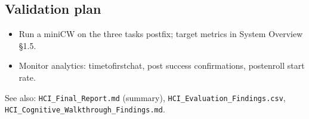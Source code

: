 \documentclass[11pt,a4paper]{article}
\begin{document}
\subsection{Validation plan}
\begin{itemize}[leftmargin=*]
  \item Run a mini\-CW on the three tasks post\-fix; target metrics in System Overview \S1.5.
  \item Monitor analytics: time\-to\-first\-chat, post success confirmations, post\-enroll start rate.
\end{itemize}

See also: \texttt{HCI\_Final\_Report.md} (summary), \texttt{HCI\_Evaluation\_Findings.csv}, \texttt{HCI\_Cognitive\_Walkthrough\_Findings.md}.
\end{document}
